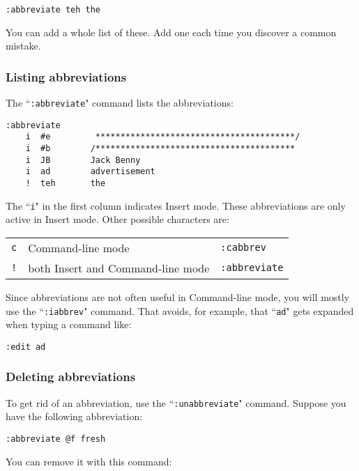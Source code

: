 \begin{Verbatim}[samepage=true]
 :abbreviate teh the
\end{Verbatim}

You can add a whole list of these.
Add one each time you discover a common mistake.
\subsubsection{Listing abbreviations}
The ``\texttt{:abbreviate}" command lists the abbreviations:

\begin{Verbatim}[samepage=true]
    :abbreviate
    i  #e         ****************************************/
    i  #b        /****************************************
    i  JB        Jack Benny
    i  ad        advertisement
    !  teh       the
\end{Verbatim}

The ``\texttt{i}" in the first column indicates Insert mode.
These abbreviations are only active in Insert mode.
Other possible characters are:

\begin{center} \begin{tabular}{c l l}
				\texttt{c} & Command-line mode & \texttt{:cabbrev}\\
				\texttt{!} & both Insert and Command-line mode & \texttt{:abbreviate}\\
\end{tabular} \end{center}

Since abbreviations are not often useful in Command-line mode, you will mostly use the ``\texttt{:iabbrev}" command.
That avoids, for example, that ``\texttt{ad}" gets expanded when typing a command like:

\begin{Verbatim}[samepage=true]
 :edit ad
\end{Verbatim}
\subsubsection{Deleting abbreviations}
To get rid of an abbreviation, use the ``\texttt{:unabbreviate}" command.
Suppose you have the following abbreviation:

\begin{Verbatim}[samepage=true]
 :abbreviate @f fresh
\end{Verbatim}

You can remove it with this command:

